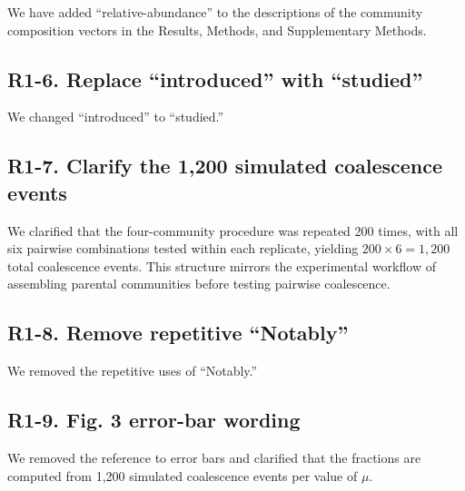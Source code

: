 We have added ``relative-abundance'' to the descriptions of the community composition vectors in the Results, Methods, and Supplementary Methods.

\subsection*{R1-6. Replace ``introduced'' with ``studied''}


We changed ``introduced'' to ``studied.''

\subsection*{R1-7. Clarify the 1,200 simulated coalescence events}


We clarified that the four-community procedure was repeated 200 times, with all six pairwise combinations tested within each replicate, yielding $200 \times 6 = 1{,}200$ total coalescence events. This structure mirrors the experimental workflow of assembling parental communities before testing pairwise coalescence.

\subsection*{R1-8. Remove repetitive ``Notably''}


We removed the repetitive uses of ``Notably.''

\subsection*{R1-9. Fig. 3 error-bar wording}


We removed the reference to error bars and clarified that the fractions are computed from 1,200 simulated coalescence events per value of $\mu$.

